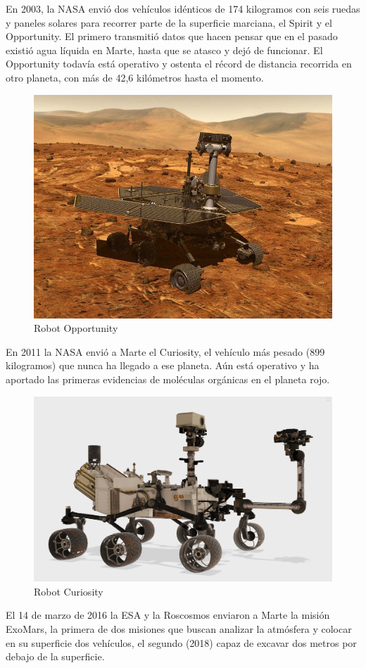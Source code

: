 En 2003, la NASA envió dos vehículos idénticos de 174 kilogramos con seis ruedas y paneles solares para recorrer parte de la superficie marciana, el Spirit y el Opportunity. El primero transmitió datos que hacen pensar que en el pasado existió agua líquida en Marte, hasta que se atasco y dejó de funcionar. El Opportunity todavía está operativo y ostenta el récord de distancia recorrida en otro planeta, con más de 42,6 kilómetros hasta el momento.

\begin{figure}[H]
    \centering
    \includegraphics[width=0.5\linewidth]{images/opportunity-3d-model.jpg}
    \caption{Robot Opportunity}
    \label{fig:robot_opportunity}
\end{figure}

En 2011 la NASA envió a Marte el Curiosity, el vehículo más pesado (899 kilogramos) que nunca ha llegado a ese planeta. Aún está operativo y ha aportado las primeras evidencias de moléculas orgánicas en el planeta rojo.

\begin{figure}[H]
    \centering
    \includegraphics[width=0.5\linewidth]{images/curiosity-3d-model.jpg}
    \caption{Robot Curiosity}
    \label{fig:robot_curiosity}
\end{figure}

El 14 de marzo de 2016 la ESA y la Roscosmos enviaron a Marte la misión ExoMars, la primera de dos misiones que buscan analizar la atmósfera y colocar en su superficie dos vehículos, el segundo (2018) capaz de excavar dos metros por debajo de la superficie.

